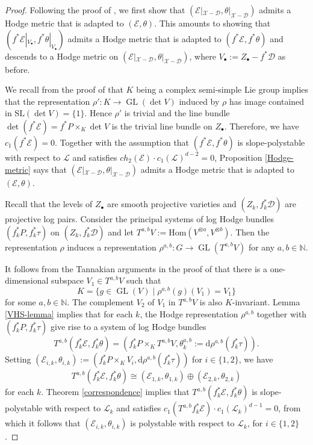 \documentclass[a4paper]{amsart}
\theoremstyle{definition}
\def\gl{\mathop{\mathrm{GL}}\nolimits}
\begin{document}
\begin{proof}
Following the proof of \cite[Theorem 4.1]{dengcadorel}, we first show that $(\mathcal{E}|_{\mathscr{X}-\mathscr{D}},\theta|_{\mathscr{X}-\mathscr{D}})$ admits a Hodge metric that is adapted to $(\mathcal{E},\mathcal{\theta})$. This amounts to showing that $(f^*\mathcal{E}|_{V_\bullet},f^*\theta|_{V_\bullet})$ admits a Hodge metric that is adapted to $(f^*\mathcal{E},f^*\theta)$ and descends to a Hodge metric on $(\mathcal{E}|_{\mathscr{X}-\mathscr{D}},\theta|_{\mathscr{X}-\mathscr{D}})$, where $V_\bullet:=Z_\bullet-f^*\mathscr{D}$ as before.

We recall from the proof of \cite[Theorem 4.1]{dengcadorel} that $K$ being a complex semi-simple Lie group implies that the representation $\rho':K\to\gl(\det V)$ induced by $\rho$ has image contained in $\mathrm{SL}(\det V)=\{1\}$. Hence $\rho'$ is trivial and the line bundle $\det(f^*\mathcal{E})=f^*P\times_K\det V$ is the trivial line bundle on $Z_\bullet$. Therefore, we have $c_1(f^*\mathcal{E})=0$. Together with the assumption that $(f^*\mathcal{E},f^*\theta)$ is slope-polystable with respect to $\mathcal{L}$ and satisfies $ch_2(\mathcal{E})\cdot c_1(\mathcal{L})^{d-2}=0$, Proposition \ref{Hodge-metric} says that $(\mathcal{E}|_{\mathscr{X}-\mathscr{D}},\theta|_{\mathscr{X}-\mathscr{D}})$ admits a Hodge metric that is adapted to $(\mathcal{E},\mathcal{\theta})$.

Recall that the levels of $Z_\bullet$ are smooth projective varieties and $(Z_k,f_k^*\mathscr{D})$ are projective log pairs. Consider the principal systems of log Hodge bundles $(f_k^*P,f_k^*\tau)$ on $(Z_k,f_k^*\mathscr{D})$ and let $T^{a,b}V:=\mathrm{Hom}(V^{\otimes a},V^{\otimes b})$. Then the representation $\rho$ induces a representation $\rho^{a,b}:G\to\gl(T^{a,b}V)$ for any $a,b\in\mathbb{N}$. 

It follows from the Tannakian arguments in the proof of \cite[Theorem 4.1]{dengcadorel} that there is a one-dimensional subspace $V_1\in T^{a,b}V$ such that 
\[
K=\{g\in\gl(V)\;|\; \rho^{a,b}(g)(V_1)=V_1\}
\]
for some $a,b\in\mathbb{N}$. The complement $V_2$ of $V_1$ in $T^{a,b}V$ is also $K$-invariant. Lemma \ref{VHS-lemma} implies that for each $k$, the Hodge representation $\rho^{a,b}$ together with $(f_k^*P,f_k^*\tau)$ give rise to a system of log Hodge bundles
\[
T^{a,b}(f_k^*\mathcal{E},f_k^*\theta)=(f_k^*P\times_KT^{a,b}V,\theta_k^{a,b}:=\mathrm{d}\rho^{a,b}(f_k^*\tau)).
\]
Setting $(\mathcal{E}_{i,k},\theta_{i,k}):=(f_k^*P\times_KV_i,\mathrm{d}\rho^{a,b}(f_k^*\tau))$ for $i\in\{1,2\}$, we have 
\[
T^{a,b}(f_k^*\mathcal{E},f_k^*\theta)\cong(\mathcal{E}_{1,k},\theta_{1,k})\oplus(\mathcal{E}_{2,k},\theta_{2,k})
\]
for each $k$. Theorem \ref{correspondence} implies that $T^{a,b}(f_k^*\mathcal{E},f_k^*\theta)$ is slope-polystable with respect to $\mathcal{L}_k$ and satisfies $c_1(T^{a,b}f_k^*\mathcal{E})\cdot c_1(\mathcal{L}_k)^{d-1}=0$, from which it follows that $(\mathcal{E}_{i,k},\theta_{i,k})$ is polystable with respect to $\mathcal{L}_k$, for $i\in\{1,2\}$.


\end{proof}
\end{document}
